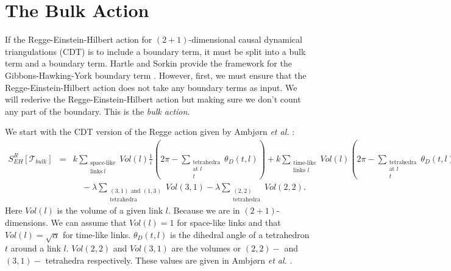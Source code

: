 \documentclass{article}
\begin{document}
\section{The Bulk Action}

If the Regge-Einstein-Hilbert action for $(2+1)$-dimensional causal
dynamical triangulations (CDT) is to include a boundary term, it must
be split into a bulk term and a boundary term. Hartle and Sorkin
provide the framework for the Gibbons-Hawking-York boundary term
\cite{BoundaryTerm}. However, first, we must ensure that the
Regge-Einstein-Hilbert action does not take any boundary terms as
input. We will rederive the Regge-Einstein-Hilbert action but making
sure we don't count any part of the boundary. This is the \textit{bulk
  action}.

We start with the CDT version of the Regge action \cite{Regge} given
by Ambj\o rn \textit{et al.} \cite{DynamicallyTriangulating}:
\begin{eqnarray}
  \label{eq:regge:bare}
  S^{R}_{EH}[\mathcal{T}_{bulk}] &=& k \sum_{\substack{\text{space-like}\\\text{links} \ l}} Vol(l)\frac{1}{i}\left(2\pi - \sum_{\substack{\text{tetrahedra}\\\text{at }l\\t}}\theta_D(t,l)\right) + k \sum_{\substack{\text{time-like}\\\text{links }l}} Vol(l)\left(2\pi - \sum_{\substack{\text{tetrahedra}\\\text{at }l\\t}}\theta_D(t,l)\right)\\
  && \quad - \lambda \sum_{\substack{(3,1)\text{ and }(1,3)\\\text{tetrahedra}}}Vol(3,1)-\lambda\sum_{\substack{(2,2)\\\text{tetrahedra}}}Vol(2,2).\nonumber
\end{eqnarray}
Here $Vol(l)$ is the volume of a given link $l$. Because we are in
$(2+1)$-dimensions. We can assume that $Vol(l)=1$ for space-like links
and that $Vol(l)=\sqrt{\alpha}$ for time-like links. $\theta_D(t,l)$
is the dihedral angle of a tetrahedron $t$ around a link
$l$. $Vol(2,2)$ and $Vol(3,1)$ are the volumes or $(2,2)-$ and
$(3,1)-$ tetrahedra respectively. These values are given in Ambj\o rn
\textit{et al.} \cite{DynamicallyTriangulating}.
\end{document}
